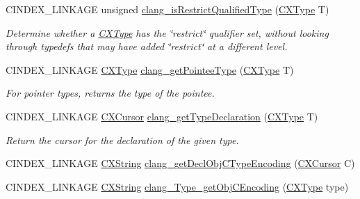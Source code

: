 \begin{DoxyCompactItemize}
C\+I\+N\+D\+E\+X\+\_\+\+L\+I\+N\+K\+A\+GE unsigned \mbox{\hyperlink{group__CINDEX__TYPES_ga12375c30c12b0c3ede87492605db1d0c}{clang\+\_\+is\+Restrict\+Qualified\+Type}} (\mbox{\hyperlink{structCXType}{C\+X\+Type}} T)
\begin{DoxyCompactList}\small\item\em Determine whether a \mbox{\hyperlink{structCXType}{C\+X\+Type}} has the \char`\"{}restrict\char`\"{} qualifier set, without looking through typedefs that may have added \char`\"{}restrict\char`\"{} at a different level. \end{DoxyCompactList}\item 
\mbox{\label{group__CINDEX__TYPES_gaafa3eb34932d8da1358d50ed949ff3ee}} 
C\+I\+N\+D\+E\+X\+\_\+\+L\+I\+N\+K\+A\+GE \mbox{\hyperlink{structCXType}{C\+X\+Type}} \mbox{\hyperlink{group__CINDEX__TYPES_gaafa3eb34932d8da1358d50ed949ff3ee}{clang\+\_\+get\+Pointee\+Type}} (\mbox{\hyperlink{structCXType}{C\+X\+Type}} T)
\begin{DoxyCompactList}\small\item\em For pointer types, returns the type of the pointee. \end{DoxyCompactList}\item 
\mbox{\label{group__CINDEX__TYPES_ga0aad74ea93a2f5dea58fd6fc0db8aad4}} 
C\+I\+N\+D\+E\+X\+\_\+\+L\+I\+N\+K\+A\+GE \mbox{\hyperlink{structCXCursor}{C\+X\+Cursor}} \mbox{\hyperlink{group__CINDEX__TYPES_ga0aad74ea93a2f5dea58fd6fc0db8aad4}{clang\+\_\+get\+Type\+Declaration}} (\mbox{\hyperlink{structCXType}{C\+X\+Type}} T)
\begin{DoxyCompactList}\small\item\em Return the cursor for the declaration of the given type. \end{DoxyCompactList}\item 
C\+I\+N\+D\+E\+X\+\_\+\+L\+I\+N\+K\+A\+GE \mbox{\hyperlink{structCXString}{C\+X\+String}} \mbox{\hyperlink{group__CINDEX__TYPES_ga3ab59f0bd04192dbf250f966b1e9fc8f}{clang\+\_\+get\+Decl\+Obj\+C\+Type\+Encoding}} (\mbox{\hyperlink{structCXCursor}{C\+X\+Cursor}} C)
\item 
C\+I\+N\+D\+E\+X\+\_\+\+L\+I\+N\+K\+A\+GE \mbox{\hyperlink{structCXString}{C\+X\+String}} \mbox{\hyperlink{group__CINDEX__TYPES_ga03b6fac5491434832d1a49ba1ebc80be}{clang\+\_\+\+Type\+\_\+get\+Obj\+C\+Encoding}} (\mbox{\hyperlink{structCXType}{C\+X\+Type}} type)
\item 

\end{DoxyCompactItemize}
